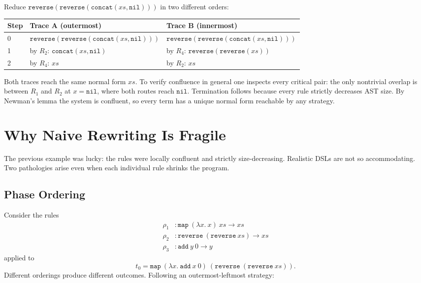 \documentclass[11pt,a4paper]{article}
\begin{document}
Reduce $\mathtt{reverse}(\mathtt{reverse}(\mathtt{concat}(xs, \mathtt{nil})))$ in two different orders:

\begin{center}
\begin{tabular}{lll}
\toprule
Step & Trace A (outermost) & Trace B (innermost) \\
\midrule
0 & $\mathtt{reverse}(\mathtt{reverse}(\mathtt{concat}(xs, \mathtt{nil})))$ &
    $\mathtt{reverse}(\mathtt{reverse}(\mathtt{concat}(xs, \mathtt{nil})))$ \\
1 & by $R_2$: $\mathtt{concat}(xs, \mathtt{nil})$ &
    by $R_4$: $\mathtt{reverse}(\mathtt{reverse}(xs))$ \\
2 & by $R_4$: $xs$ & by $R_2$: $xs$ \\
\bottomrule
\end{tabular}
\end{center}

Both traces reach the same normal form $xs$. To verify confluence in general one inspects every critical pair: the only nontrivial overlap is between $R_1$ and $R_2$ at $x = \mathtt{nil}$, where both routes reach $\mathtt{nil}$. Termination follows because every rule strictly decreases AST size. By Newman's lemma the system is confluent, so every term has a unique normal form reachable by any strategy.

\section{Why Naive Rewriting Is Fragile}\label{sec:fragile}

The previous example was lucky: the rules were locally confluent and strictly size-decreasing. Realistic DSLs are not so accommodating. Two pathologies arise even when each individual rule shrinks the program.

\subsection{Phase Ordering}\label{sec:phase-ordering}

Consider the rules
\begin{align*}
\rho_1 &: \mathtt{map}\ (\lambda x.\ x)\ xs \to xs \\
\rho_2 &: \mathtt{reverse}\ (\mathtt{reverse}\ xs) \to xs \\
\rho_3 &: \mathtt{add}\ y\ 0 \to y
\end{align*}
applied to
\[
  t_0 = \mathtt{map}\ (\lambda x.\ \mathtt{add}\ x\ 0)\ (\mathtt{reverse}\ (\mathtt{reverse}\ xs)).
\]
Different orderings produce different outcomes. Following an outermost-leftmost strategy:
\end{document}
